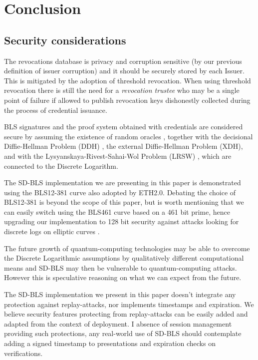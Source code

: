 
\section{Conclusion}
\subsection{Security considerations}

The revocations database is privacy and corruption sensitive (by our
previous definition of issuer corruption) and it should be securely
stored by each Issuer. This is mitigated by the adoption of threshold
revocation. When using threshold revocation there is still the need
for a \textit{revocation trustee} who may be a single point of failure
if allowed to publish revocation keys dishonestly collected during the
process of credential issuance.

BLS signatures and the proof system obtained with credentials are
considered secure by assuming the existence of random oracles
\cite{random-oracle}, together with the decisional Diffie-Hellman
Problem (DDH) \cite{DDH-problem}, the external Diffie-Hellman Problem
(XDH), and with the Lysyanskaya-Rivest-Sahai-Wol Problem (LRSW)
\cite{lrsw-assumption}, which are connected to the Discrete
Logarithm.

The SD-BLS implementation we are presenting in this paper is
demonstrated using the BLS12-381 curve \cite{bls381-12} also adopted
by ETH2.0. Debating the choice of BLS12-381 is beyond the scope of
this paper, but is worth mentioning that we can easily switch using
the BLS461 curve based on a 461 bit prime, hence upgrading our
implementation to 128 bit security \cite{updating-key-pairings}
against attacks looking for discrete logs on elliptic curves
\cite{discrete-log-attack}.

The future growth of quantum-computing technologies may be able to
overcome the Discrete Logarithmic assumptions by qualitatively
different computational means and SD-BLS may then be vulnerable to
quantum-computing attacks. However this is speculative reasoning on
what we can expect from the future.

The SD-BLS implementation we present in this paper doesn't integrate
any protection against replay-attacks, nor implements timestamps and
expiration. We believe security features protecting from
replay-attacks can be easily added and adapted from the context of
deployment. I absence of session management providing such
protections, any real-world use of SD-BLS should contemplate adding a
signed timestamp to presentations and expiration checks on
verifications.

